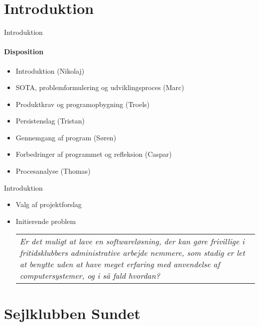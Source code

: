 \section{Introduktion}

\begin{frame}{Introduktion}
\framesubtitle{Disposition}

	\begin{itemize}
	\item Introduktion (Nikolaj)
	\item SOTA, problemformulering og udviklingsproces (Marc)
	\item Produktkrav og programopbygning (Troels)
	\item Persistenslag (Tristan)
	\item Gennemgang af program (Søren)
	\item Forbedringer af programmet og refleksion (Caspar)
	\item Procesanalyse	(Thomas)
	\end{itemize}
\end{frame}

\begin{frame}{Introduktion}
	\begin{itemize}	
	\item Valg af projektforslag
	\item Initierende problem			
	\newline
		
		\begin{tabular}{|p{8cm}|}
		\textit{Er det muligt at lave en softwareløsning, der kan gøre frivillige i fritidsklubbers administrative
		arbejde nemmere, som stadig er let at benytte uden at have meget erfaring med anvendelse af computersystemer, og i så fald hvordan?}
  		\end{tabular}
	\end{itemize}
\end{frame}


\section{Sejlklubben Sundet}

